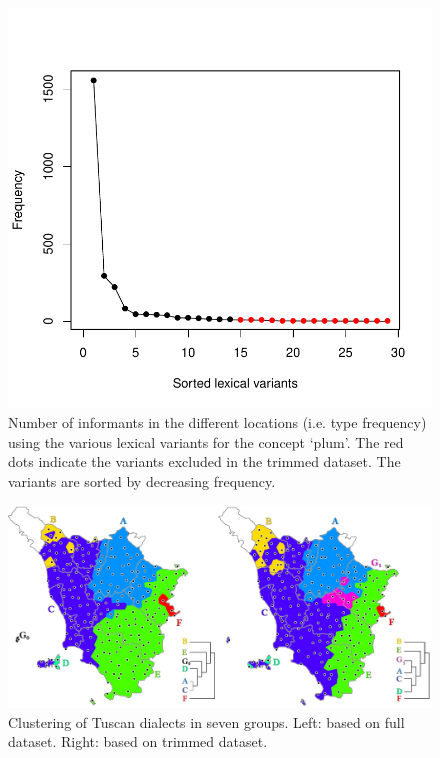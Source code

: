 \documentclass[output=paper]{LSP/langsci}
\begin{document}
\begin{figure}
\includegraphics[width=\textwidth]{illustrations/wiel_monte_fig1}
\caption{Number of informants in the different locations (i.e. type frequency) using the various lexical variants for the concept `plum'. The red dots indicate the variants excluded in the trimmed dataset. The variants are sorted by decreasing frequency.}
\label{fig:1}
\end{figure}

\begin{figure}
\includegraphics[width=\textwidth]{illustrations/wiel_monte_fig2}
\caption{Clustering of Tuscan dialects in seven groups. Left: based on full dataset. Right: based on trimmed dataset.}
\label{fig:2}
\end{figure}
\end{document}
